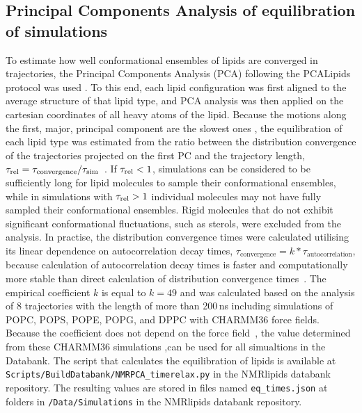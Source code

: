 \documentclass[fleqn,10pt]{wlscirep}
\begin{document}
\subsection{Principal Components Analysis of equilibration of simulations}
To estimate how well conformational ensembles of lipids are converged in trajectories, the Principal Components Analysis (PCA) following the PCALipids protocol was used \cite{buslaev16,buslaev2020principal}. 
To this end, each lipid configuration was first aligned to the average structure of that lipid type, and PCA analysis was then applied on the cartesian coordinates of all heavy atoms of the lipid. Because the motions along the first, major, principal component are the slowest ones \cite{buslaev16}, the equilibration of each lipid type was estimated from the ratio between the distribution convergence of the trajectories projected on the first PC and the trajectory length, $\tau_{\rm rel} = \tau_{\text{convergence}}/\tau_{\text{sim}}$~\cite{buslaev16, buslaev2020principal}. If $\tau_{\rm rel} < 1$, simulations can be considered to be sufficiently long for lipid molecules to sample their conformational ensembles, while in simulations with $\tau_{\rm rel} > 1$ individual molecules may not have fully sampled their conformational ensembles. Rigid molecules that do not exhibit significant conformational fluctuations, such as sterols, were excluded from the analysis. 
In practise, the distribution convergence times were calculated utilising its linear dependence on autocorrelation decay times,
    $\tau_{\text{convergence}} = k*\tau_{\text{autocorrelation}}$,
because calculation of autocorrelation decay times is faster and computationally more stable than direct calculation of distribution convergence times~\cite{buslaev16, buslaev2020principal}. The empirical coefficient $k$ is equal to $k = 49$ and was calculated based on the analysis of 8 trajectories with the length of more than 200\,ns including simulations of POPC, POPS, POPE, POPG, and DPPC with CHARMM36 force fields. %
Because the coefficient does not depend on the force field~\cite{buslaev16}, the value determined from these CHARMM36 simulations ,can be used for all simualtions in the Databank. The script that calculates the equilibration of lipids is available at \texttt{Scripts/BuildDatabank/NMRPCA\_timerelax.py} in the NMRlipids databank repository. The resulting values are stored in files named \texttt{eq\_times.json} at folders in \texttt{/Data/Simulations} in the NMRlipids databank repository. 
\end{document}
